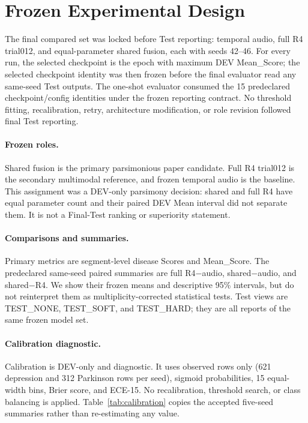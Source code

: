 \section{Frozen Experimental Design}
\label{sec:experiments}

The final compared set was locked before Test reporting: temporal audio, full R4 trial012, and equal-parameter shared fusion, each with seeds 42--46. For every run, the selected checkpoint is the epoch with maximum DEV Mean\_Score; the selected checkpoint identity was then frozen before the final evaluator read any same-seed Test outputs. The one-shot evaluator consumed the 15 predeclared checkpoint/config identities under the frozen reporting contract. No threshold fitting, recalibration, retry, architecture modification, or role revision followed final Test reporting.

\paragraph{Frozen roles.}
Shared fusion is the primary parsimonious paper candidate. Full R4 trial012 is the secondary multimodal reference, and frozen temporal audio is the baseline. This assignment was a DEV-only parsimony decision: shared and full R4 have equal parameter count and their paired DEV Mean interval did not separate them. It is not a Final-Test ranking or superiority statement.

\paragraph{Comparisons and summaries.}
Primary metrics are segment-level disease Scores and Mean\_Score. The predeclared same-seed paired summaries are full R4$-$audio, shared$-$audio, and shared$-$R4. We show their frozen means and descriptive 95\% intervals, but do not reinterpret them as multiplicity-corrected statistical tests. Test views are TEST\_NONE, TEST\_SOFT, and TEST\_HARD; they are all reports of the same frozen model set.

\paragraph{Calibration diagnostic.}
Calibration is DEV-only and diagnostic. It uses observed rows only (621 depression and 312 Parkinson rows per seed), sigmoid probabilities, 15 equal-width bins, Brier score, and ECE-15. No recalibration, threshold search, or class balancing is applied. Table~\ref{tab:calibration} copies the accepted five-seed summaries rather than re-estimating any value.

